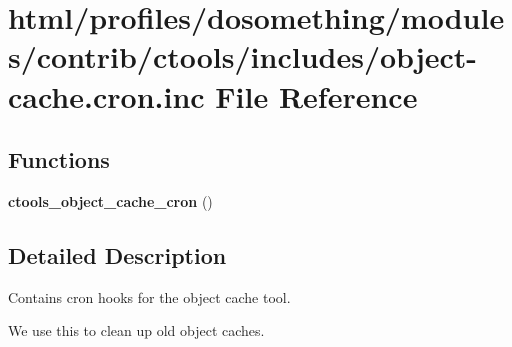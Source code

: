 \hypertarget{object-cache_8cron_8inc}{
\section{html/profiles/dosomething/modules/contrib/ctools/includes/object-\/cache.cron.inc File Reference}
\label{object-cache_8cron_8inc}
}
\subsection*{Functions}
\begin{DoxyCompactItemize}
\item 
\hypertarget{object-cache_8cron_8inc_ab64ccfc46c2a8e7f7f7c43f48a934d83}{
{\bfseries ctools\_\-object\_\-cache\_\-cron} ()}
\label{object-cache_8cron_8inc_ab64ccfc46c2a8e7f7f7c43f48a934d83}

\end{DoxyCompactItemize}


\subsection{Detailed Description}
Contains cron hooks for the object cache tool.

We use this to clean up old object caches. 